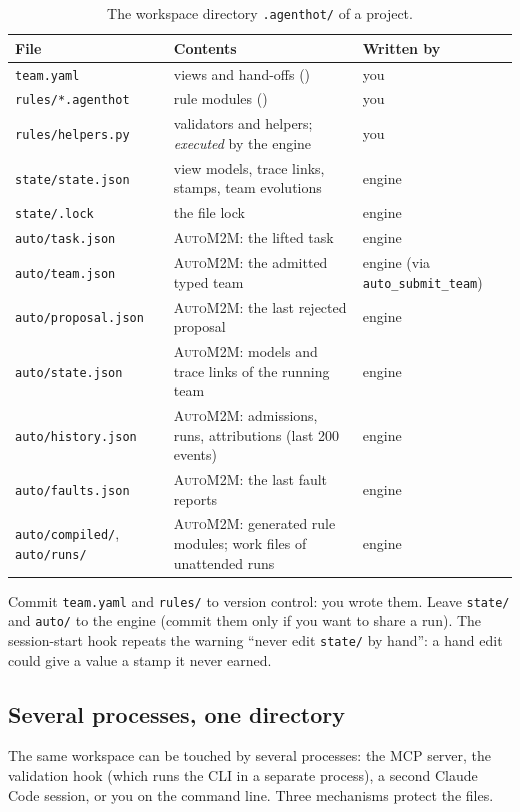 \documentclass[10pt,a4paper]{article}
\newcommand{\auto}{\textsc{AutoM2M}}
\newcommand{\cc}{Claude Code}
\newcommand{\file}[1]{\texttt{#1}}
\newcommand{\mcptool}[1]{\texttt{#1}}
\begin{document}
\begin{table}[!htb]
\centering\small
\caption{The workspace directory \file{.agenthot/} of a project.}
\label{tab:files}
\begin{tabularx}{\textwidth}{@{}l Y l@{}}
\toprule
{}File & Contents & Written by \\
\midrule
\file{team.yaml} & views and hand-offs () & you \\
\file{rules/*.agenthot} & rule modules () & you \\
\file{rules/helpers.py} & validators and helpers; \emph{executed} by the engine & you \\
\file{state/state.json} & view models, trace links, stamps, team evolutions & engine \\
\file{state/.lock} & the file lock & engine \\
\file{auto/task.json} & \auto{}: the lifted task & engine \\
\file{auto/team.json} & \auto{}: the admitted typed team & engine (via \mcptool{auto\_submit\_team}) \\
\file{auto/proposal.json} & \auto{}: the last rejected proposal & engine \\
\file{auto/state.json} & \auto{}: models and trace links of the running team & engine \\
\file{auto/history.json} & \auto{}: admissions, runs, attributions (last 200 events) & engine \\
\file{auto/faults.json} & \auto{}: the last fault reports & engine \\
\file{auto/compiled/}, \file{auto/runs/} & \auto{}: generated rule modules; work files of unattended runs & engine \\
\bottomrule
\end{tabularx}
\end{table}

Commit \file{team.yaml} and \file{rules/} to version control: you wrote
them. Leave \file{state/} and \file{auto/} to the engine (commit them only
if you want to share a run). The session-start hook repeats the warning
``never edit \file{state/} by hand'': a hand edit could give a value a stamp
it never earned.

\subsection{Several processes, one directory}

The same workspace can be touched by several processes: the MCP server, the
validation hook (which runs the CLI in a separate process), a second \cc{}
session, or you on the command line. Three mechanisms protect the files.
\end{document}
